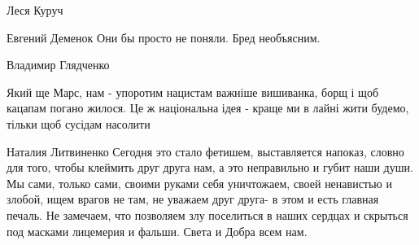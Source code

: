 Леся Куруч

Евгений Деменок Они бы просто не поняли. Бред необъясним.

Владимир Глядченко

Який ще Марс, нам - упоротим нацистам важніше вишиванка, борщ і щоб кацапам
погано жилося. Це ж національна ідея - краще ми в лайні жити будемо, тільки щоб
сусідам насолити

Наталия Литвиненко
Сегодня это стало фетишем, выставляется напоказ, словно для того, чтобы клеймить друг друга нам, а это неправильно и губит наши души.
Мы сами, только сами, своими руками себя уничтожаем, своей ненавистью и злобой, ищем врагов не там, не уважаем друг друга- в этом и есть главная печаль.
Не замечаем, что позволяем злу поселиться в наших сердцах и скрыться под масками лицемерия и фальши.
Света и Добра всем нам.
